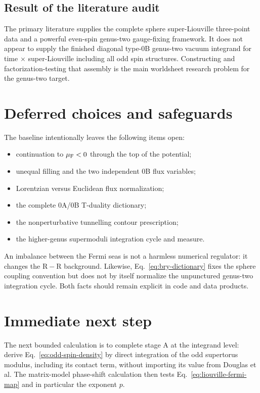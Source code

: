 \documentclass[11pt]{article}
\newcommand{\RR}{\mathrm{R\!\!-\!\!R}}
\begin{document}
\subsection{Result of the literature audit}

The primary literature supplies the complete sphere super-Liouville
three-point data and a powerful even-spin genus-two gauge-fixing framework.
It does not appear to supply the finished diagonal type-0B genus-two vacuum
integrand for time $\times$ super-Liouville including all odd spin
structures.  Constructing and factorization-testing that assembly is the
main worldsheet research problem for the genus-two target.

\section{Deferred choices and safeguards}

The baseline intentionally leaves the following items open:
\begin{itemize}
 \item continuation to $\mu_{\rm F}<0$ through the top of the potential;
 \item unequal filling and the two independent 0B flux variables;
 \item Lorentzian versus Euclidean flux normalization;
 \item the complete 0A/0B T-duality dictionary;
 \item the nonperturbative tunnelling contour prescription;
 \item the higher-genus supermoduli integration cycle and measure.
\end{itemize}
An imbalance between the Fermi seas is not a harmless numerical regulator: it
changes the $\RR$ background.  Likewise, Eq.~\eqref{eq:bry-dictionary} fixes
the sphere coupling convention but does not by itself normalize the
unpunctured genus-two integration cycle.  Both facts should remain explicit
in code and data products.

\section{Immediate next step}

The next bounded calculation is to complete stage A at the integrand level:
derive Eq.~\eqref{eq:odd-spin-density} by direct integration of the odd
supertorus modulus, including its contact term, without importing its value
from Douglas et al.  The matrix-model phase-shift calculation then tests
Eq.~\eqref{eq:liouville-fermi-map} and in particular the exponent $p$.



\end{document}
